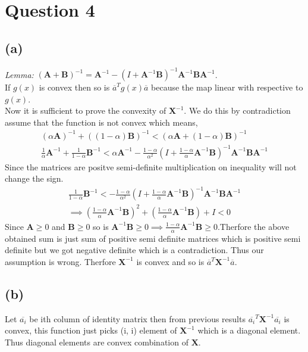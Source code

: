 \documentclass{article}
\begin{document}
\section*{\hfil Question 4}
\subsection*{(a)}
\textit{Lemma:} $(\mathbf{A} + \mathbf{B})^{-1} = \mathbf{A}^{-1} - (I + \mathbf{A}^{-1}\mathbf{B})^{-1}\mathbf{A}^{-1}\mathbf{B}\mathbf{A}^{-1}$.\\
If $g(x)$ is convex then so is $\overline{a}^Tg(x)\overline{a}$ because the map linear with respective to $g(x)$.\\
Now it is sufficient to prove the convexity of $\mathbf{X}^{-1}$. We do this by contradiction assume that the function is not convex which means,
\begin{gather*}
	(\alpha \mathbf{A})^{-1} + ((1-\alpha)\mathbf{B})^{-1} < \left(\alpha \mathbf{A} + (1-\alpha)\mathbf{B}\right)^{-1}\\
	\frac{1}{\alpha} \mathbf{A}^{-1} + \frac{1}{1-\alpha}\mathbf{B}^{-1} < \alpha \mathbf{A}^{-1} - \frac{1-\alpha}{\alpha ^2}(I + \frac{1-\alpha}{\alpha}\mathbf{A}^{-1}\mathbf{B})^{-1}\mathbf{A}^{-1}\mathbf{BA}^{-1}
\end{gather*}
Since the matrices are positve semi-definite multiplication on inequality will not change the sign.
\begin{gather*}
	\frac{1}{1-\alpha}\mathbf{B}^{-1} <  - \frac{1-\alpha}{\alpha ^2}(I + \frac{1-\alpha}{\alpha}\mathbf{A}^{-1}\mathbf{B})^{-1}\mathbf{A}^{-1}\mathbf{BA}^{-1}\\
	\implies \left(\frac{1-\alpha}{\alpha}\mathbf{A}^{-1}\mathbf{B}\right)^2 + \left(\frac{1-\alpha}{\alpha}\mathbf{A}^{-1}\mathbf{B}\right) + I < 0
\end{gather*}
Since $\mathbf{A} \ge 0$ and $\mathbf{B} \ge 0$ so is $\mathbf{A}^{-1}\mathbf{B} \ge 0 \implies \frac{1-\alpha}{\alpha}\mathbf{A}^{-1}\mathbf{B} \ge 0$.Therfore the above obtained sum is just sum of positive semi definite matrices which is positive semi definite but we got negative definite which is a contradiction. Thus our assumption is wrong. Therfore $\mathbf{X}^{-1}$ is convex and so is $\overline{a}^T\mathbf{X}^{-1}\overline{a}$.
\subsection*{(b)}
Let $\overline{a_i}$ be ith column of identity matrix then from previous results $\overline{a_i}^T{\mathbf{X}^{-1}}\overline{a_i}$ is convex, this function just picks (i, i) element of ${\mathbf{X}^{-1}}$ which is a diagonal element. Thus diagonal elements are convex combination of $\mathbf{X}$.
\end{document}
